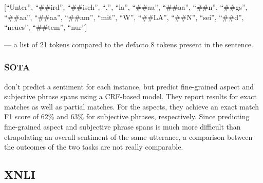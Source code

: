 [``Unter'', ``\#\#ird'', ``\#\#isch'', ``,'', ``la'', ``\#\#aa'', ``\#\#aa'', ``\#\#n'', ``\#\#gs'', ``\#\#aa'', ``\#\#aa'', ``\#\#am'', ``mit'', ``W'', ``\#\#LA'', ``\#\#N'', ``sei'', ``\#\#d'', ``neues'', ``\#\#tem'', ``nur'']

--- a list of 21 tokens compared to the defacto 8 tokens present in the sentence.











\subsubsection{SOTA}

\cite{sanger2016scare} don't predict a sentiment for each instance, but predict fine-grained
aspect and subjective phrase spans using a CRF-based model.
They report results for exact matches as well as partial matches.
For the aspects, they achieve an exact match F1 score of 62\% and 63\% for subjective phrases, respectively.
Since predicting fine-grained aspect and subjective phrase spans is much more difficult than
etrapolating an overall sentiment of the same utterance, a comparison between the outcomes of the
two tasks are not really comparable.



\subsection{XNLI}

